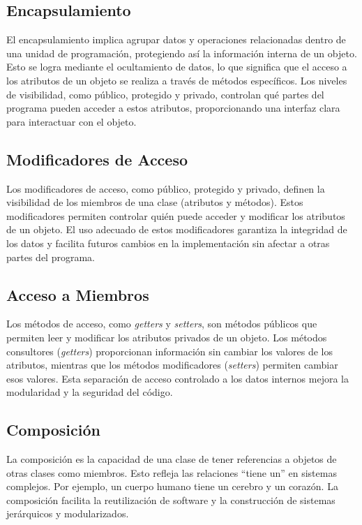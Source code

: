 \documentclass[11pt, twocolumn]{article}
\begin{document}
  \subsection*{Encapsulamiento}
  El encapsulamiento implica agrupar datos y operaciones relacionadas dentro de una unidad de programación, protegiendo así la información interna de un objeto. Esto se logra mediante el ocultamiento de datos, lo que significa que el acceso a los atributos de un objeto se realiza a través de métodos específicos. Los niveles de visibilidad, como público, protegido y privado, controlan qué partes del programa pueden acceder a estos atributos, proporcionando una interfaz clara para interactuar con el objeto.

  \subsection*{Modificadores de Acceso}
  Los modificadores de acceso, como público, protegido y privado, definen la visibilidad de los miembros de una clase (atributos y métodos). Estos modificadores permiten controlar quién puede acceder y modificar los atributos de un objeto. El uso adecuado de estos modificadores garantiza la integridad de los datos y facilita futuros cambios en la implementación sin afectar a otras partes del programa.

  \subsection*{Acceso a Miembros}
  Los métodos de acceso, como \textit{getters} y \textit{setters}, son métodos públicos que permiten leer y modificar los atributos privados de un objeto. Los métodos consultores (\textit{getters}) proporcionan información sin cambiar los valores de los atributos, mientras que los métodos modificadores (\textit{setters}) permiten cambiar esos valores. Esta separación de acceso controlado a los datos internos mejora la modularidad y la seguridad del código.

  \subsection*{Composición}
  La composición es la capacidad de una clase de tener referencias a objetos de otras clases como miembros. Esto refleja las relaciones ``tiene un'' en sistemas complejos. Por ejemplo, un cuerpo humano tiene un cerebro y un corazón. La composición facilita la reutilización de software y la construcción de sistemas jerárquicos y modularizados.
\end{document}
